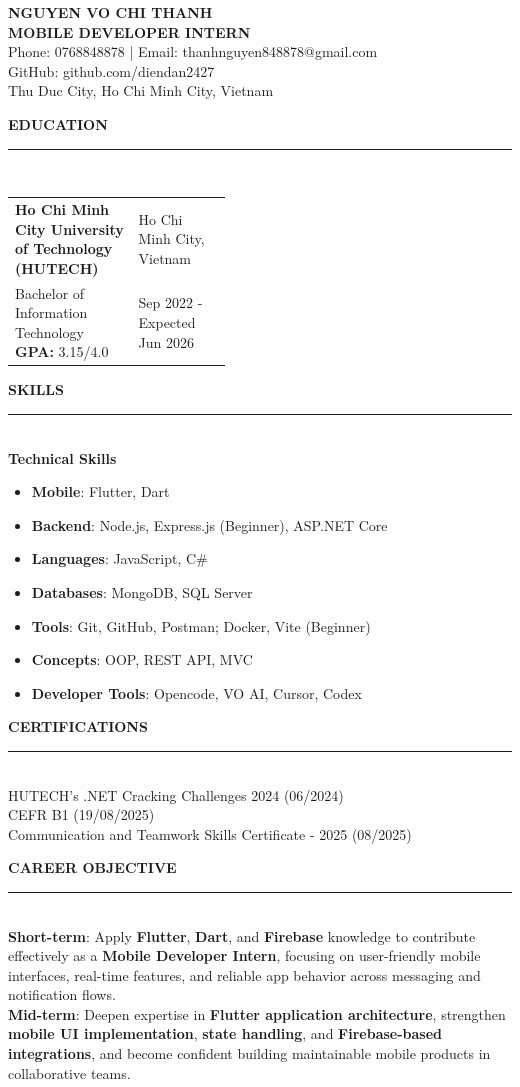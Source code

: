 \documentclass[10pt,a4paper]{article}
\newcommand{\cvsection}[1]{
  \vspace{8pt}
  {\fontsize{14}{17}\selectfont\textbf{\textcolor{headingblue}{\MakeUppercase{#1}}}}\\[-3pt]
  \textcolor{linegray}{\rule{\linewidth}{0.6pt}}\\[2pt]
}
\begin{document}
\begin{center}
	{\fontsize{31}{35}\selectfont\textbf{\textcolor{headingblue}{NGUYEN VO CHI THANH}}}\\[4pt]
	{\fontsize{14}{16}\selectfont\textbf{MOBILE DEVELOPER INTERN}}\\[5pt]
	{\fontsize{11.5}{13.5}\selectfont Phone: 0768848878 \;|\; Email: thanhnguyen848878@gmail.com}\\[1pt]
	{\fontsize{11.5}{13.5}\selectfont GitHub: github.com/diendan2427}\\[1pt]
	{\fontsize{11.5}{13.5}\selectfont Thu Duc City, Ho Chi Minh City, Vietnam}
\end{center}

\cvsection{Education}
\vspace{1pt}
\begin{tabularx}{\linewidth}{@{}X>{\raggedleft\arraybackslash}p{0.43\linewidth}@{}}
	\textbf{Ho Chi Minh City University of Technology (HUTECH)} & Ho Chi Minh City, Vietnam    \\[2pt]
	Bachelor of Information Technology \textbf{GPA:} 3.15/4.0   & Sep 2022 - Expected Jun 2026
\end{tabularx}
\vspace{-4pt}

\cvsection{Skills}
\textbf{Technical Skills}
\begin{itemize}
	\item \textbf{Mobile}: Flutter, Dart
	\item \textbf{Backend}: Node.js, Express.js (Beginner), ASP.NET Core
	\item \textbf{Languages}: JavaScript, C\#
	\item \textbf{Databases}: MongoDB, SQL Server
	\item \textbf{Tools}: Git, GitHub, Postman; Docker, Vite (Beginner)
	\item \textbf{Concepts}: OOP, REST API, MVC
	\item \textbf{Developer Tools}: Opencode, VO AI, Cursor, Codex
\end{itemize}

\cvsection{Certifications}
HUTECH's .NET Cracking Challenges 2024 (06/2024)\\[2pt]
CEFR B1 (19/08/2025)\\[2pt]
Communication and Teamwork Skills Certificate - 2025 (08/2025)

\cvsection{Career Objective}
\textbf{Short-term}: Apply \textbf{Flutter}, \textbf{Dart}, and \textbf{Firebase} knowledge to contribute effectively as a \textbf{Mobile Developer Intern}, focusing on user-friendly mobile interfaces, real-time features, and reliable app behavior across messaging and notification flows.\\[5pt]
\textbf{Mid-term}: Deepen expertise in \textbf{Flutter application architecture}, strengthen \textbf{mobile UI implementation}, \textbf{state handling}, and \textbf{Firebase-based integrations}, and become confident building maintainable mobile products in collaborative teams.
\end{document}
